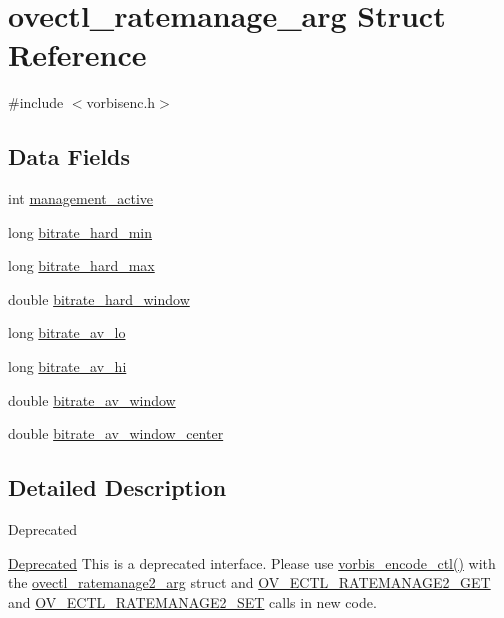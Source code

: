 \hypertarget{structovectl__ratemanage__arg}{}\section{ovectl\+\_\+ratemanage\+\_\+arg Struct Reference}
\label{structovectl__ratemanage__arg}


{\ttfamily \#include $<$vorbisenc.\+h$>$}

\subsection*{Data Fields}
\begin{DoxyCompactItemize}
\item 
int \hyperlink{structovectl__ratemanage__arg_ad792d1b89a5d07f0f0e90509df4bc606}{management\+\_\+active}
\item 
long \hyperlink{structovectl__ratemanage__arg_a449d3ea8d0645742af859dd17b41fbfb}{bitrate\+\_\+hard\+\_\+min}
\item 
long \hyperlink{structovectl__ratemanage__arg_a3620024b5a9e4b4df6d20deb6c125c92}{bitrate\+\_\+hard\+\_\+max}
\item 
double \hyperlink{structovectl__ratemanage__arg_a68caf36fc02a52199705fa331d118446}{bitrate\+\_\+hard\+\_\+window}
\item 
long \hyperlink{structovectl__ratemanage__arg_ac241670a3a608f114acaf8f26fe4e913}{bitrate\+\_\+av\+\_\+lo}
\item 
long \hyperlink{structovectl__ratemanage__arg_ac1e81b5a2e705022ca895f494718ded7}{bitrate\+\_\+av\+\_\+hi}
\item 
double \hyperlink{structovectl__ratemanage__arg_a1232e7296ae5e52f52039bed2560c505}{bitrate\+\_\+av\+\_\+window}
\item 
double \hyperlink{structovectl__ratemanage__arg_aad317d50fb4d072e2c55f0a60d1a83b2}{bitrate\+\_\+av\+\_\+window\+\_\+center}
\end{DoxyCompactItemize}


\subsection{Detailed Description}
\begin{DoxyRefDesc}{Deprecated}
\item[\hyperlink{deprecated__deprecated000001}{Deprecated}]This is a deprecated interface. Please use \hyperlink{vorbisenc_8h_a5f398a378e20b8ce5e3341a582e773bd}{vorbis\+\_\+encode\+\_\+ctl()} with the \hyperlink{structovectl__ratemanage2__arg}{ovectl\+\_\+ratemanage2\+\_\+arg} struct and \hyperlink{vorbisenc_8h_af95048070bedb467f80ce85e20057126}{O\+V\+\_\+\+E\+C\+T\+L\+\_\+\+R\+A\+T\+E\+M\+A\+N\+A\+G\+E2\+\_\+\+G\+ET} and \hyperlink{vorbisenc_8h_a5075e0acb85fd45398a290594f83d6ba}{O\+V\+\_\+\+E\+C\+T\+L\+\_\+\+R\+A\+T\+E\+M\+A\+N\+A\+G\+E2\+\_\+\+S\+ET} calls in new code.\end{DoxyRefDesc}


